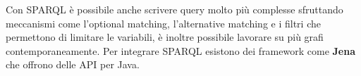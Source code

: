 Con SPARQL è possibile anche scrivere query molto più complesse sfruttando meccanismi come l'optional matching, l'alternative matching e i filtri che permettono di limitare le variabili, è inoltre possibile lavorare su più grafi contemporaneamente.
Per integrare SPARQL esistono dei framework come \textbf{Jena} che offrono delle API per Java.














